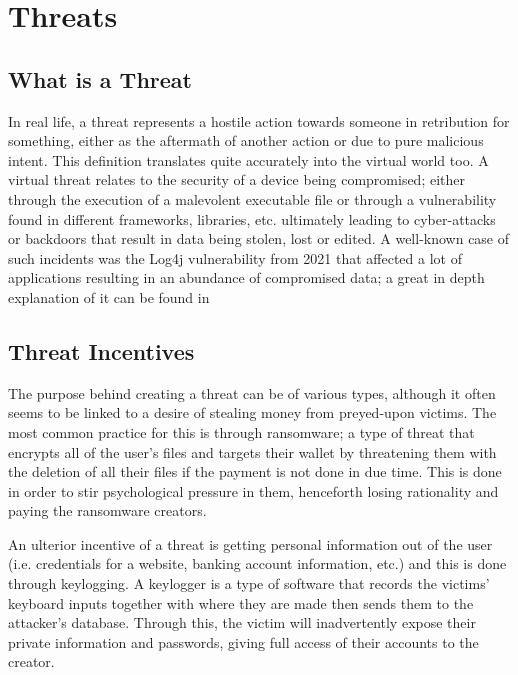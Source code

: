 
\chapter{Threats}\label{cap:threats}


\section{What is a Threat}
In real life, a threat represents a hostile action towards someone in retribution for something, either as the aftermath of another action or due to pure malicious intent. This definition translates quite accurately into the virtual world too. A virtual threat relates to the security of a device being compromised; either through the execution of a malevolent executable file or through a vulnerability found in different frameworks, libraries, etc. ultimately leading to cyber-attacks or backdoors that result in data being stolen, lost or edited. A well-known case of such incidents was the Log4j vulnerability from 2021 that affected a lot of applications resulting in an abundance of compromised data; a great in depth explanation of it can be found in \cite{hiesgen2022race}


\section{Threat Incentives}\label{sect:incentive}
The purpose behind creating a threat can be of various types, although it often seems to be linked to a desire of stealing money from preyed-upon victims. The most common practice for this is through ransomware; a type of threat that encrypts all of the user's files and targets their wallet by threatening them with the deletion of all their files if the payment is not done in due time. This is done in order to stir psychological pressure in them, henceforth losing rationality and paying the ransomware creators.%
\newline

\noindent An ulterior incentive of a threat is getting personal information out of the user (i.e. credentials for a website, banking account information, etc.) and this is done through keylogging. A keylogger is a type of software that records the victims' keyboard inputs together with where they are made then sends them to the attacker's database. Through this, the victim will inadvertently expose their private information and passwords, giving full access of their accounts to the creator.%
\newline

